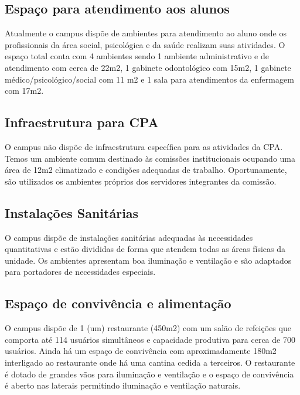 \subsection{Espaço para atendimento aos alunos}
Atualmente o campus dispõe de ambientes para atendimento ao aluno onde os profissionais da área social, psicológica e da saúde realizam suas atividades. O espaço total conta com 4 ambientes sendo 1 ambiente administrativo e de atendimento com cerca de 22m2, 1 gabinete odontológico com 15m2, 1 gabinete médico/psicológico/social com 11 m2 e 1 sala para atendimentos da enfermagem com 17m2.\\

\subsection{Infraestrutura para CPA}

O campus não dispõe de infraestrutura específica para as atividades da CPA. Temos um ambiente comum destinado às comissões institucionais ocupando uma área de 12m2 climatizado e condições adequadas de trabalho. Oportunamente, são utilizados os ambientes próprios dos servidores integrantes da comissão.\\

\subsection{Instalações Sanitárias}
O campus dispõe de instalações sanitárias adequadas às necessidades quantitativas e estão divididas de forma que atendem todas as áreas físicas da unidade. Os ambientes apresentam boa iluminação e ventilação e são adaptados para portadores de necessidades especiais.\\

\subsection{Espaço de convivência e alimentação}
O campus dispõe de 1 (um) restaurante (450m2) com um salão de refeições que comporta até 114 usuários simultâneos e capacidade produtiva para cerca de 700 usuários. Ainda há um espaço de convivência com aproximadamente 180m2 interligado ao restaurante onde há uma cantina cedida a terceiros. O restaurante é dotado de grandes vãos para iluminação e ventilação e o espaço de convivência é aberto nas laterais permitindo iluminação e ventilação naturais.\\

